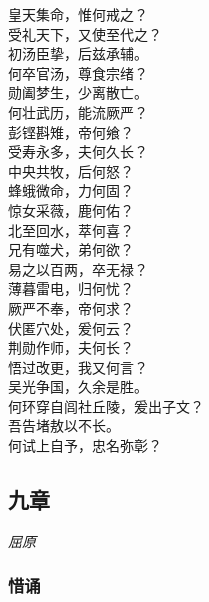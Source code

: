 \documentclass[]{article}
\begin{document}
皇天集命，惟何戒之？\\
受礼天下，又使至代之？\\
初汤臣挚，后兹承辅。\\
何卒官汤，尊食宗绪？\\
勋阖梦生，少离散亡。\\
何壮武历，能流厥严？\\
彭铿斟雉，帝何飨？\\
受寿永多，夫何久长？\\
中央共牧，后何怒？\\
蜂蛾微命，力何固？\\
惊女采薇，鹿何佑？\\
北至回水，萃何喜？\\
兄有噬犬，弟何欲？\\
易之以百两，卒无禄？\\
薄暮雷电，归何忧？\\
厥严不奉，帝何求？\\
伏匿穴处，爰何云？\\
荆勋作师，夫何长？\\
悟过改更，我又何言？\\
吴光争国，久余是胜。\\
何环穿自闾社丘陵，爰出子文？\\
吾告堵敖以不长。\\
何试上自予，忠名弥彰？

\hypertarget{header-n75}{%
\subsection{九章}\label{header-n75}}

\emph{屈原}

\hypertarget{header-n80}{%
\subsubsection{惜诵}\label{header-n80}}
\end{document}
